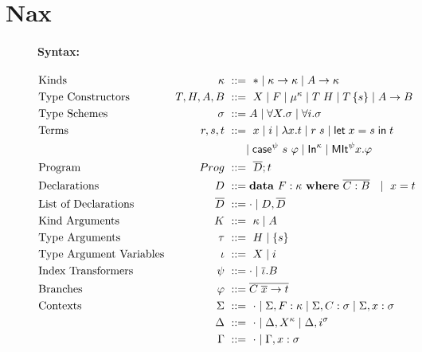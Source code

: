 \section{Nax}\label{sec:nax}
\begin{figure}
\begin{framed}
\paragraph{Syntax:}
\begin{align*}
&\text{Kinds}
	& \kappa	&~ ::= ~ * \mid \kappa -> \kappa \mid A -> \kappa
 \\
&\text{Type Constructors}
	& T,H,A,B	&~ ::= ~ X \mid F
			   \mid \mu^\kappa
			   \mid T\;H \mid T\,\{s\}
			   \mid A -> B
 \\
&\text{Type Schemes}
	& \sigma	&~ ::= A
			   \mid \forall X.\sigma
			   \mid \forall i.\sigma
 \\
&\text{Terms}
	& r,s,t		&~ ::= ~ x \mid i
			   \mid \lambda x.t \mid r\;s \mid \mathsf{let}\;x = s\;\mathsf{in}\; t \\
&	&		&~~~~~
			   \mid \mathsf{case}^\psi~s~\varphi
			   \mid \mathsf{In}^\kappa
			   \mid \mathsf{MIt}^\psi x.\varphi
 \\
&\text{Program}
	& Prog		&~ ::= ~ \overline{D};t
 \\
&\text{Declarations}
	& D		&~ ::= \mathbf{data}~ F : \kappa
                             ~ \mathbf{where} ~ \overline{C : B}
			 ~~\mid~ x = t
 \\
&\text{List of Declarations}
	& \overline{D}	&~ ::= \cdot \mid D,\overline{D}
 \\
&\text{Kind Arguments}
	& K		&~ ::= ~ \kappa \mid A
 \\
&\text{Type Arguments}
	& \tau		&~ ::= ~ H \mid \{s\}
 \\
&\text{Type Argument Variables}
	& \iota		&~ ::= ~ X \mid i
 \\
&\text{Index Transformers}
	& \psi		&~ ::= \cdot \mid \overline\iota . B
 \\
&\text{Branches}
	& \varphi	&~ ::= \overline{C\;\overline{x} -> t}
 \\
&\text{Contexts}
	& \Sigma	&~ ::= ~ \cdot
			   \mid \Sigma, F: \kappa
			   \mid \Sigma, C: \sigma
			   \mid \Sigma, x: \sigma
 \\
&	& \Delta	&~ ::= ~ \cdot
			   \mid \Delta, X^\kappa
			   \mid \Delta, i^\sigma
 \\
&	& \Gamma	&~ ::= ~ \cdot \mid \Gamma,x:\sigma
\end{align*}


\end{framed}
\end{figure}
